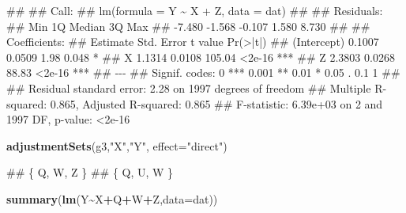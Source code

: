 \documentclass[
]{book}
\newenvironment{Shaded}{\begin{snugshade}}{\end{snugshade}}
\newcommand{\AttributeTok}[1]{\textcolor[rgb]{0.13,0.29,0.53}{#1}}
\newcommand{\FunctionTok}[1]{\textcolor[rgb]{0.13,0.29,0.53}{\textbf{#1}}}
\newcommand{\NormalTok}[1]{#1}
\newcommand{\SpecialCharTok}[1]{\textcolor[rgb]{0.81,0.36,0.00}{\textbf{#1}}}
\newcommand{\StringTok}[1]{\textcolor[rgb]{0.31,0.60,0.02}{#1}}
\begin{document}
\begin{Shaded}
\begin{Highlighting}[]
\NormalTok{\#\# }
\NormalTok{\#\# Call:}
\NormalTok{\#\# lm(formula = Y \textasciitilde{} X + Z, data = dat)}
\NormalTok{\#\# }
\NormalTok{\#\# Residuals:}
\NormalTok{\#\#    Min     1Q Median     3Q    Max }
\NormalTok{\#\# {-}7.480 {-}1.568 {-}0.107  1.580  8.730 }
\NormalTok{\#\# }
\NormalTok{\#\# Coefficients:}
\NormalTok{\#\#             Estimate Std. Error t value Pr(\textgreater{}|t|)    }
\NormalTok{\#\# (Intercept)   0.1007     0.0509    1.98    0.048 *  }
\NormalTok{\#\# X             1.1314     0.0108  105.04   \textless{}2e{-}16 ***}
\NormalTok{\#\# Z             2.3803     0.0268   88.83   \textless{}2e{-}16 ***}
\NormalTok{\#\# {-}{-}{-}}
\NormalTok{\#\# Signif. codes:  0 \textquotesingle{}***\textquotesingle{} 0.001 \textquotesingle{}**\textquotesingle{} 0.01 \textquotesingle{}*\textquotesingle{} 0.05 \textquotesingle{}.\textquotesingle{} 0.1 \textquotesingle{} \textquotesingle{} 1}
\NormalTok{\#\# }
\NormalTok{\#\# Residual standard error: 2.28 on 1997 degrees of freedom}
\NormalTok{\#\# Multiple R{-}squared:  0.865,  Adjusted R{-}squared:  0.865 }
\NormalTok{\#\# F{-}statistic: 6.39e+03 on 2 and 1997 DF,  p{-}value: \textless{}2e{-}16}
\end{Highlighting}
\end{Shaded}

\begin{Shaded}
\begin{Highlighting}[]
\FunctionTok{adjustmentSets}\NormalTok{(g3,}\StringTok{"X"}\NormalTok{,}\StringTok{"Y"}\NormalTok{, }\AttributeTok{effect=}\StringTok{"direct"}\NormalTok{)}
\end{Highlighting}
\end{Shaded}

\begin{Shaded}
\begin{Highlighting}[]
\NormalTok{\#\# \{ Q, W, Z \}}
\NormalTok{\#\# \{ Q, U, W \}}
\end{Highlighting}
\end{Shaded}

\begin{Shaded}
\begin{Highlighting}[]
\FunctionTok{summary}\NormalTok{(}\FunctionTok{lm}\NormalTok{(Y}\SpecialCharTok{\textasciitilde{}}\NormalTok{X}\SpecialCharTok{+}\NormalTok{Q}\SpecialCharTok{+}\NormalTok{W}\SpecialCharTok{+}\NormalTok{Z,}\AttributeTok{data=}\NormalTok{dat))}
\end{Highlighting}
\end{Shaded}
\end{document}
